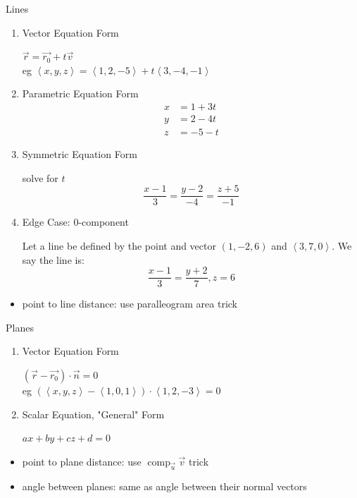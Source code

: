 \documentclass[11pt]{article}
\theoremstyle{definition}
\newcommand{\col}[1]{\begin{minipage}{\columnwidth}#1\end{minipage}}
\DeclareMathOperator{\comp}{comp}
\begin{document}
\newpage
\begin{multicols}{2}
  \col{
    Lines
    \begin{enumerate}[(1)]
      \item Vector Equation Form
      
      $\vec{r} = \vec{r_0} + t\vec{v}$ \\
      eg $\left<x,y,z\right> = \left<1,2,-5\right> + t\left<3,-4,-1\right>$
      \item Parametric Equation Form
      \begin{align*}
        x &= 1+3t \\
        y &= 2-4t \\
        z &= -5-t 
      \end{align*}
      
      \item Symmetric Equation Form 
      
      solve for $t$
      \[\frac{x-1}{3} = \frac{y-2}{-4} = \frac{z+5}{-1}\]

      \item Edge Case: 0-component
      
      Let a line be defined by the point and vector $(1,-2,6)$ and $\left<3,7,0\right>$. We say the line is:
      \[ \frac{x-1}{3} = \frac{y+2}{7}, z=6 \]
    \end{enumerate}
    \begin{itemize}
      \item point to line distance: use paralleogram area trick
    \end{itemize}

    Planes
    \begin{enumerate}[(1)]
      \item Vector Equation Form
      
      $(\vec{r}-\vec{r_0})\cdot \vec{n} = 0$ \\
      eg $(\left<x,y,z\right>-\left<1,0,1\right>) \cdot \left<1,2,-3\right> = 0$
      \item Scalar Equation, "General" Form
      
      $ax +by +cz +d = 0$
    \end{enumerate}
    \begin{itemize}
      \item point to plane distance: use $\comp_{\vec{u}}\vec{v}$ trick
      \item angle between planes: same as angle between their normal vectors
    \end{itemize}

}
\end{multicols}
\end{document}
